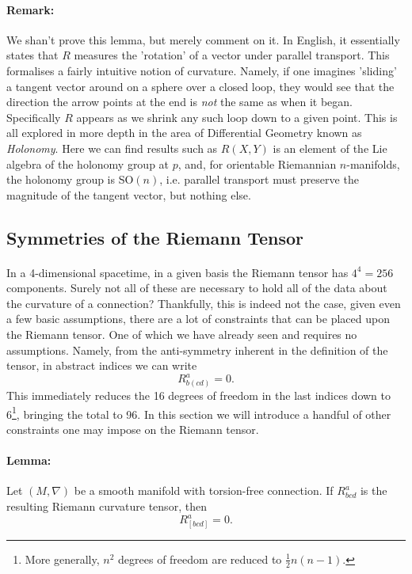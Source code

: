 \documentclass[11pt,fleqn]{report}
\begin{document}
\paragraph{Remark:} We shan't prove this lemma, but merely comment on it. In English, it essentially states that $R$ measures the 'rotation' of a vector under parallel transport. This formalises a fairly intuitive notion of curvature. Namely, if one imagines 'sliding' a tangent vector around on a sphere over a closed loop, they would see that the direction the arrow points at the end is \textit{not} the same as when it began. Specifically $R$ appears as we shrink any such loop down to a given point. This is all explored in more depth in the area of Differential Geometry known as \textit{Holonomy}. Here we can find results such as $R(X,Y)$ is an element of the Lie algebra of the holonomy group at $p$, and, for orientable Riemannian $n$-manifolds, the holonomy group is SO$(n)$, i.e. parallel transport must preserve the magnitude of the tangent vector, but nothing else.

\subsection{Symmetries of the Riemann Tensor}

\paragraph{} In a 4-dimensional spacetime, in a given basis the Riemann tensor has $4^4 = 256$ components. Surely not all of these are necessary to hold all of the data about the curvature of a connection? Thankfully, this is indeed not the case, given even a few basic assumptions, there are a lot of constraints that can be placed upon the Riemann tensor. One of which we have already seen and requires no assumptions. Namely, from the anti-symmetry inherent in the definition of the tensor, in abstract indices we can write
	\begin{equation}
		R^a_{b(cd)} = 0.
	\end{equation}
This immediately reduces the 16 degrees of freedom in the last indices down to 6\footnote{More generally, $n^2$ degrees of freedom are reduced to $\tfrac{1}{2}n(n-1)$.}, bringing the total to 96. In this section we will introduce a handful of other constraints one may impose on the Riemann tensor.

\paragraph{Lemma:} Let $(M,\nabla)$ be a smooth manifold with torsion-free connection. If $R^a_{bcd}$ is the resulting Riemann curvature tensor, then
	\begin{equation}
		R^a_{[bcd]} = 0.
	\end{equation}
	
\end{document}
